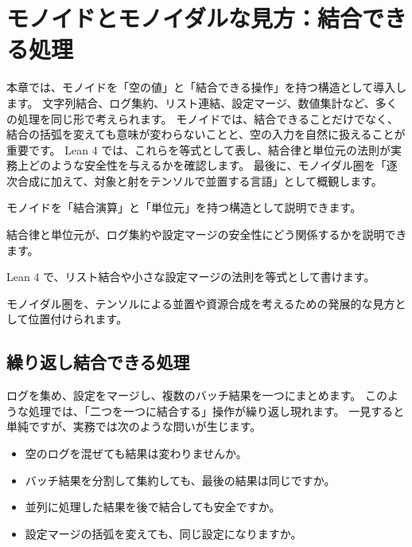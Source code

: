 \chapter{モノイドとモノイダルな見方：結合できる処理}
\label{chap:monoids-monoidal}

\begin{chapterabstract}
本章では、モノイドを「空の値」と「結合できる操作」を持つ構造として導入します。
文字列結合、ログ集約、リスト連結、設定マージ、数値集計など、多くの処理を同じ形で考えられます。
モノイドでは、結合できることだけでなく、結合の括弧を変えても意味が変わらないことと、空の入力を自然に扱えることが重要です。
Lean 4 では、これらを等式として表し、結合律と単位元の法則が実務上どのような安全性を与えるかを確認します。
最後に、モノイダル圏を「逐次合成に加えて、対象と射をテンソルで並置する言語」として概観します。
\end{chapterabstract}

\begin{learninggoals}
\item モノイドを「結合演算」と「単位元」を持つ構造として説明できます。
\item 結合律と単位元が、ログ集約や設定マージの安全性にどう関係するかを説明できます。
\item Lean 4 で、リスト結合や小さな設定マージの法則を等式として書けます。
\item モノイダル圏を、テンソルによる並置や資源合成を考えるための発展的な見方として位置付けられます。
\end{learninggoals}

\section{繰り返し結合できる処理}

ログを集め、設定をマージし、複数のバッチ結果を一つにまとめます。
このような処理では、「二つを一つに結合する」操作が繰り返し現れます。
一見すると単純ですが、実務では次のような問いが生じます。

\begin{itemize}
\item 空のログを混ぜても結果は変わりませんか。
\item バッチ結果を分割して集約しても、最後の結果は同じですか。
\item 並列に処理した結果を後で結合しても安全ですか。
\item 設定マージの括弧を変えても、同じ設定になりますか。
\end{itemize}


